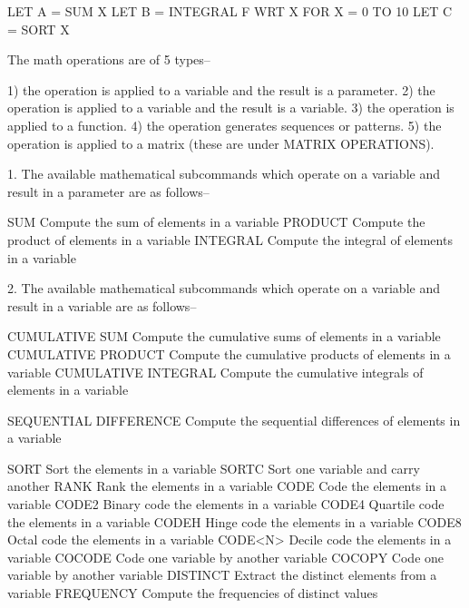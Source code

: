    LET A = SUM X
   LET B = INTEGRAL F WRT X FOR X = 0 TO 10
   LET C = SORT X
 
The math operations are of 5 types--
 
   1) the operation is applied to a variable and the result is a
      parameter.
   2) the operation is applied to a variable and the result is a
      variable.
   3) the operation is applied to a function.
   4) the operation generates sequences or patterns.
   5) the operation is applied to a matrix (these are under MATRIX
      OPERATIONS).
 
1. The available mathematical subcommands which operate on a variable
   and result in a parameter are as follows--
 
      SUM                    Compute the sum of elements in a variable
      PRODUCT                Compute the product of elements in a
                             variable
      INTEGRAL               Compute the integral of elements in a
                             variable
 
2. The available mathematical subcommands which operate on a variable
   and result in a variable are as follows--
 
      CUMULATIVE SUM         Compute the cumulative sums of elements in
                             a variable
      CUMULATIVE PRODUCT     Compute the cumulative products of
                             elements in a variable
      CUMULATIVE INTEGRAL    Compute the cumulative integrals of
                             elements in a variable
 
      SEQUENTIAL DIFFERENCE  Compute the sequential differences of
                             elements in a variable
 
      SORT                   Sort the elements in a variable
      SORTC                  Sort one variable and carry another
      RANK                   Rank the elements in a variable
      CODE                   Code the elements in a variable
      CODE2                  Binary code the elements in a variable
      CODE4                  Quartile code the elements in a variable
      CODEH                  Hinge code the elements in a variable
      CODE8                  Octal code the elements in a variable
      CODE<N>                Decile code the elements in a variable
      COCODE                 Code one variable by another variable
      COCOPY                 Code one variable by another variable
      DISTINCT               Extract the distinct elements from a
                             variable
      FREQUENCY              Compute the frequencies of distinct values
 
